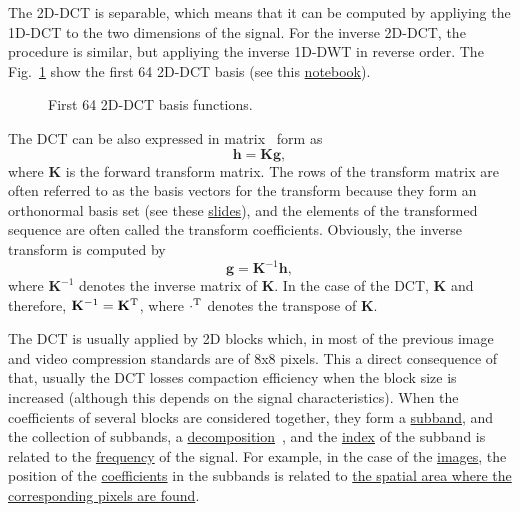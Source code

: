 The 2D-DCT is separable, which means that it can be computed by
appliying the 1D-DCT to the two dimensions of the signal. For the
inverse 2D-DCT, the procedure is similar, but appliying the inverse
1D-DWT in reverse order. The Fig.~\ref{fig:2D-DCT_basis} show the
first 64 2D-DCT basis (see this
\href{https://github.com/Sistemas-Multimedia/Sistemas-Multimedia.github.io/blob/master/milestones/07-DCT/DCT_basis.ipynb}{notebook}).

\begin{figure}
  \centering
  \caption{First 64 2D-DCT basis functions.}
  \label{fig:2D-DCT_basis}
\end{figure}

The DCT can be also expressed in matrix~\cite{sayood2017introduction}
form as
\begin{equation}
  {\mathbf h} = {\mathbf K}{\mathbf g},
\end{equation}
where ${\mathbf K}$ is the forward transform matrix. The rows of the
transform matrix are often referred to as the basis vectors for the
transform because they form an orthonormal basis set (see these
\href{https://cseweb.ucsd.edu/classes/fa17/cse166-a/lec13.pdf}{slides}),
and the elements of the transformed sequence are often called the
transform coefficients. Obviously, the inverse transform is computed
by
\begin{equation}
  {\mathbf g} = {\mathbf K}^{-1}{\mathbf h},
\end{equation}
where ${\mathbf K}^{-1}$ denotes the inverse matrix of ${\mathbf
  K}$. In the case of the DCT, ${\mathbf K}$ and therefore, ${\mathbf
  K}^{-1}={\mathbf K}^{\text T}$, where $\cdot^{\text T}$ denotes the
transpose of ${\mathbf K}$.

The DCT is usually applied by 2D blocks which, in most of the previous
image and video compression standards are of 8x8 pixels. This a direct
consequence of that, usually the DCT losses compaction efficiency when
the block size is increased (although this depends on the signal
characteristics). When the coefficients of several blocks are
considered together, they form a
\href{https://en.wikipedia.org/wiki/Sub-band_coding}{subband}, and the
collection of subbands, a
\href{https://en.wikipedia.org/wiki/Discrete_wavelet_transform}{decomposition}~\cite{vetterli2014foundations},
and the
\href{https://en.wikipedia.org/wiki/Array_data_structure#Element_identifier_and_addressing_formulas}{index}
of the subband is related to the
\href{https://en.wikipedia.org/wiki/Frequency}{frequency} of the
signal. For example, in the case of the
\href{https://en.wikipedia.org/wiki/Digital_image}{images}, the
position of the
\href{https://en.wikipedia.org/wiki/Coefficient}{coefficients} in the
subbands is related to
\href{https://github.com/Sistemas-Multimedia/Sistemas-Multimedia.github.io/blob/master/milestones/07-DCT/block_DCT_compression.ipynb}{the
  spatial area where the corresponding pixels are found}.

